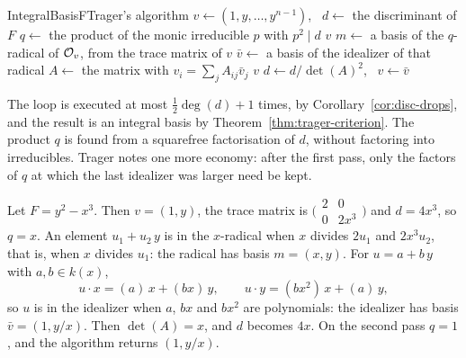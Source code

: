 \begin{algo}{IntegralBasis}{F}{Trager's algorithm}
\State $v \gets (1, y, \dots, y^{n-1})$, \ $d \gets$ the discriminant of $F$
\Loop
  \State $q \gets$ the product of the monic irreducible $p$ with $p^2 \mid d$
   \Return $v$ \EndIf
  \State $m \gets$ a basis of the $q$-radical of $\mathcal{O}_v$, from the trace matrix of $v$
  \State $\bar v \gets$ a basis of the idealizer of that radical
  \State $A \gets$ the matrix with $v_i = \sum_j A_{ij} \bar v_j$
   \Return $v$ \EndIf
  \State $d \gets d / \det(A)^2$, \ $v \gets \bar v$
\EndLoop
\end{algo}

The loop is executed at most $\frac12 \deg(d) + 1$ times, by
Corollary~\ref{cor:disc-drops}, and the result is an integral basis by
Theorem~\ref{thm:trager-criterion}. The product $q$ is found from a
squarefree factorisation of $d$, without factoring into irreducibles. Trager
notes one more economy: after the first pass, only the factors of $q$ at
which the last idealizer was larger need be kept.

\begin{example}\label{ex:ib-cusp}
Let $F = y^2 - x^3$. Then $v = (1, y)$, the trace matrix is
$\bigl(\begin{smallmatrix} 2 & 0 \\ 0 & 2x^3 \end{smallmatrix}\bigr)$ and $d
= 4x^3$, so $q = x$. An element $u_1 + u_2\, y$ is in the $x$-radical when $x$
divides $2u_1$ and $2x^3 u_2$, that is, when $x$ divides $u_1$: the radical
has basis $m = (x, y)$. For $u = a + b\,y$ with $a, b \in k(x)$,
\[
  u \cdot x = (a)\, x + (b x)\, y, \qquad
  u \cdot y = (b x^2)\, x + (a)\, y ,
\]
so $u$ is in the idealizer when $a$, $bx$ and $b x^2$ are polynomials: the
idealizer has basis $\bar v = (1, y/x)$. Then $\det(A) = x$, and $d$ becomes
$4x$. On the second pass $q = 1$, and the algorithm returns $(1, y/x)$.
\end{example}


